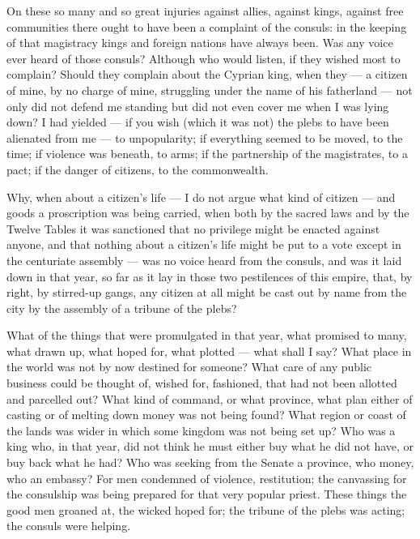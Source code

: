  On these so many and so great injuries against allies, against kings, against free communities there ought to have been a complaint of the consuls: in the keeping of that magistracy kings and foreign nations have always been. Was any voice ever heard of those consuls? Although who would listen, if they wished most to complain? Should they complain about the Cyprian king, when they --- a citizen of mine, by no charge of mine, struggling under the name of his fatherland --- not only did not defend me standing but did not even cover me when I was lying down? I had yielded --- if you wish (which it was not) the plebs to have been alienated from me --- to unpopularity; if everything seemed to be moved, to the time; if violence was beneath, to arms; if the partnership of the magistrates, to a pact; if the danger of citizens, to the commonwealth.

 Why, when about a citizen's life --- I do not argue what kind of citizen --- and goods a proscription was being carried, when both by the sacred laws and by the Twelve Tables it was sanctioned that no privilege might be enacted against anyone, and that nothing about a citizen's life might be put to a vote except in the centuriate assembly --- was no voice heard from the consuls, and was it laid down in that year, so far as it lay in those two pestilences of this empire, that, by right, by stirred-up gangs, any citizen at all might be cast out by name from the city by the assembly of a tribune of the plebs?

 What of the things that were promulgated in that year, what promised to many, what drawn up, what hoped for, what plotted --- what shall I say? What place in the world was not by now destined for someone? What care of any public business could be thought of, wished for, fashioned, that had not been allotted and parcelled out? What kind of command, or what province, what plan either of casting or of melting down money was not being found? What region or coast of the lands was wider in which some kingdom was not being set up? Who was a king who, in that year, did not think he must either buy what he did not have, or buy back what he had? Who was seeking from the Senate a province, who money, who an embassy? For men condemned of violence, restitution; the canvassing for the consulship was being prepared for that very popular priest. These things the good men groaned at, the wicked hoped for; the tribune of the plebs was acting; the consuls were helping.

